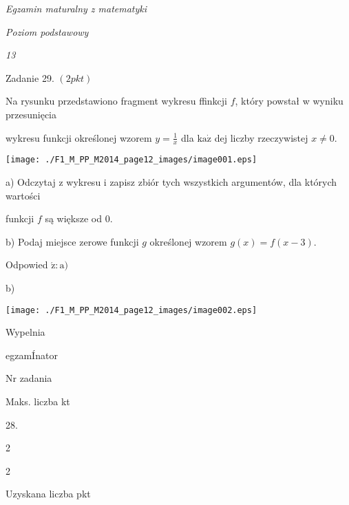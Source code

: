 \documentclass[a4paper,12pt]{article}
\begin{document}
{\it Egzamin maturalny z matematyki}

{\it Poziom podstawowy}

{\it 13}

Zadanie 29. $(2pkt)$

Na rysunku przedstawiono fragment wykresu ffinkcji $f$, który powstał w wyniku przesunięcia

wykresu funkcji określonej wzorem $y=\displaystyle \frac{1}{x}$ dla $\mathrm{k}\mathrm{a}\dot{\mathrm{z}}$ dej liczby rzeczywistej $x\neq 0.$
\begin{center}
\texttt{[image: ./F1\_M\_PP\_M2014\_page12\_images/image001.eps]}
\end{center}
a) Odczytaj z wykresu i zapisz zbiór tych wszystkich argumentów, dla których wartości

funkcji $f$ są większe od 0.

b) Podaj miejsce zerowe funkcji $g$ określonej wzorem $g(x)=f(x-3).$

Odpowied $\acute{\mathrm{z}}:\mathrm{a})$

b)
\begin{center}
\texttt{[image: ./F1\_M\_PP\_M2014\_page12\_images/image002.eps]}
\end{center}
Wypelnia

egzamÍnator

Nr zadania

Maks. liczba kt

28.

2

2

Uzyskana liczba pkt
\end{document}
